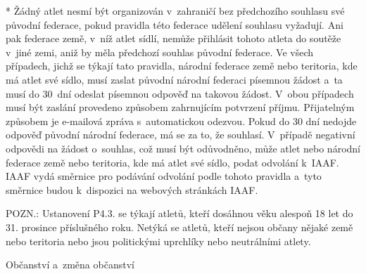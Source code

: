 * Žádný atlet nesmí být organizován v~zahraničí bez předchozího souhlasu své původní federace, pokud pravidla této federace udělení souhlasu vyžadují. Ani pak federace země, v~níž atlet sídlí, nemůže přihlásit tohoto atleta do soutěže v~jiné zemi, aniž by měla předchozí souhlas původní federace. Ve všech případech, jichž se týkají tato pravidla, národní federace země nebo teritoria, kde má atlet své sídlo, musí zaslat původní národní federaci písemnou žádost a~ta musí do 30~dní odeslat písemnou odpověď na takovou žádost. V~obou případech musí být zaslání provedeno způsobem zahrnujícím potvrzení příjmu. Přijatelným způsobem je e-mailová zpráva s~automatickou odezvou. Pokud do 30 dní nedojde odpověď původní národní federace, má se za to, že souhlasí. V~případě negativní odpovědi na žádost o~souhlas, což musí být odůvodněno, může atlet nebo národní federace země nebo teritoria, kde má atlet své sídlo, podat odvolání k~IAAF. IAAF vydá směrnice pro podávání odvolání podle tohoto pravidla a~tyto směrnice budou k~dispozici na webových stránkách IAAF.
\enditems

POZN.: Ustanovení P4.3. se týkají atletů, kteří dosáhnou věku alespoň 18 let do 31. prosince příslušného roku.
Netýká se atletů, kteří nejsou občany nějaké země nebo teritoria nebo jsou politickými uprchlíky nebo neutrálními atlety.

\secc Občanství a~změna občanství

